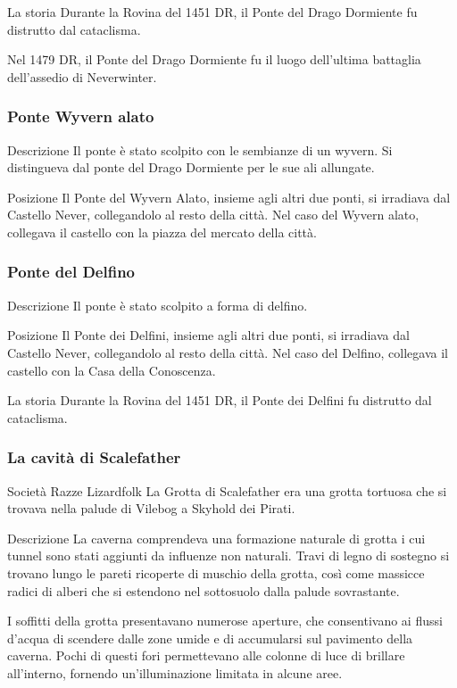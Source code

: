 \documentclass{article}
\begin{document}
La storia
Durante la Rovina del 1451 DR, il Ponte del Drago Dormiente fu distrutto dal cataclisma.

Nel 1479 DR, il Ponte del Drago Dormiente fu il luogo dell'ultima battaglia dell'assedio di Neverwinter.
              \subsubsection{Ponte Wyvern alato}
Descrizione
Il ponte è stato scolpito con le sembianze di un wyvern. Si distingueva dal ponte del Drago Dormiente per le sue ali allungate.

Posizione
Il Ponte del Wyvern Alato, insieme agli altri due ponti, si irradiava dal Castello Never, collegandolo al resto della città. Nel caso del Wyvern alato, collegava il castello con la piazza del mercato della città.
              \subsubsection{Ponte del Delfino}
Descrizione
Il ponte è stato scolpito a forma di delfino.

Posizione
Il Ponte dei Delfini, insieme agli altri due ponti, si irradiava dal Castello Never, collegandolo al resto della città. Nel caso del Delfino, collegava il castello con la Casa della Conoscenza.

La storia
Durante la Rovina del 1451 DR, il Ponte dei Delfini fu distrutto dal cataclisma.
              \subsubsection{La cavità di Scalefather}
Società
Razze
Lizardfolk
La Grotta di Scalefather era una grotta tortuosa che si trovava nella palude di Vilebog a Skyhold dei Pirati.

Descrizione\newline
La caverna comprendeva una formazione naturale di grotta i cui tunnel sono stati aggiunti da influenze non naturali. Travi di legno di sostegno si trovano lungo le pareti ricoperte di muschio della grotta, così come massicce radici di alberi che si estendono nel sottosuolo dalla palude sovrastante.

I soffitti della grotta presentavano numerose aperture, che consentivano ai flussi d'acqua di scendere dalle zone umide e di accumularsi sul pavimento della caverna. Pochi di questi fori permettevano alle colonne di luce di brillare all'interno, fornendo un'illuminazione limitata in alcune aree.
\end{document}
